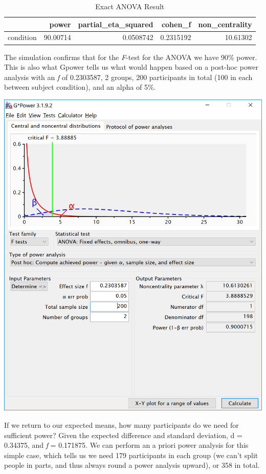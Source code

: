 \documentclass[]{book}
\begin{document}
\begin{table}[!h]

\caption{\label{tab:unnamed-chunk-21}Exact ANOVA Result}
\centering
\begin{tabular}{l|r|r|r|r}
\hline
  & power & partial\_eta\_squared & cohen\_f & non\_centrality\\
\hline
condition & 90.00714 & 0.0508742 & 0.2315192 & 10.61302\\
\hline
\end{tabular}
\end{table}

The simulation confirms that for the \emph{F}-test for the ANOVA we have 90\% power. This is also what Gpower tells us what would happen based on a post-hoc power analysis with an \emph{f} of 0.2303587, 2 groups, 200 participants in total (100 in each between subject condition), and an alpha of 5\%.

\includegraphics{screenshots/gpower_8.png}

If we return to our expected means, how many participants do we need for sufficient power? Given the expected difference and standard deviation, d = 0.34375, and \emph{f} = 0.171875. We can perform an a priori power analysis for this simple case, which tells us we need 179 participants in each group (we can't split people in parts, and thus always round a power analysis upward), or 358 in total.
\end{document}
